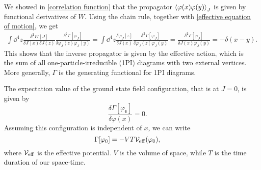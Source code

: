 We showed in \autoref{correlation function} that the propagator $\ex{\varphi(x)\varphi(y)}_J$ is given by functional derivatives of $W$.
Using the chain rule, together with \autoref{effective equation of motion}, we get
\begin{align}
    \int \dd^4 z \frac{\delta^2 W[J]}{\delta J(x) \delta J(z)} 
    \frac{\delta^2 \Gamma[\varphi_J]}{\delta \varphi_J(z) \varphi_J(y)}
    =
    \int \dd^4 z \frac{\delta \varphi_J[z]}{\delta J(x)}
    \frac{\delta^2 \Gamma[\varphi_J]}{\delta \varphi_J(z) \varphi_J(y)}
    = \frac{\delta^2 \Gamma[\varphi_J]}{\delta J(x) \varphi_J(y)}
    = - \delta(x - y).
\end{align}
This shows that the inverse propagator is given by the effective action, which is the sum of all one-particle-irreducible (1PI) diagrams with two external vertices.
More generally, $\Gamma$ is the generating functional for 1PI diagrams.

The expectation value of the ground state field configuration, that is at $J=0$, is given by 
\begin{equation}
    \frac{\delta \Gamma[\varphi_0]}{\delta \varphi(x)} = 0.
\end{equation}
Assuming this configuration is independent of $x$, we can write
\begin{equation}
    \Gamma[\varphi_0] = - V T \mathcal{V}_{\mathrm{eff}}(\varphi_0),
\end{equation}
where $\mathcal{V}_{\mathrm{eff}}$ is the effective potential.
$V$ is the volume of space, while $T$ is the time duration of our space-time.

